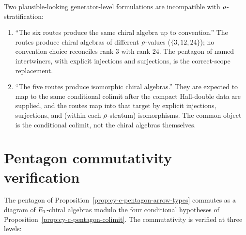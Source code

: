 \begin{remark}
\label{rem:refinement-rules-out-naive}
Two plausible-looking generator-level formulations are incompatible with $\rho$-stratification:
\begin{enumerate}[label=\textup{(N\arabic*)}]
 \item ``The six routes produce the same chiral algebra up to convention.'' The routes produce chiral
 algebras of different $\rho$-values ($\{3, 12, 24\}$); no convention choice reconciles rank $3$
 with rank $24$. The pentagon of named intertwiners, with explicit injections and surjections, is
 the correct-scope replacement.
 \item ``The five routes produce isomorphic chiral algebras.'' They are expected to map to the same
 conditional colimit after the compact Hall-double data are supplied, and the routes map into that target by
 explicit injections, surjections, and (within each $\rho$-stratum) isomorphisms. The common object is the
 conditional colimit, not the chiral algebras themselves.
\end{enumerate}
\end{remark}

\section{Pentagon commutativity verification}
\label{sec:cy-c-gl-pentagon-commutativity}

The pentagon of Proposition~\ref{prop:cy-c-pentagon-arrow-types} commutes as a diagram of $E_{1}$-chiral
algebras modulo the four conditional hypotheses of Proposition~\ref{prop:cy-c-pentagon-colimit}. The
commutativity is verified at three levels:

